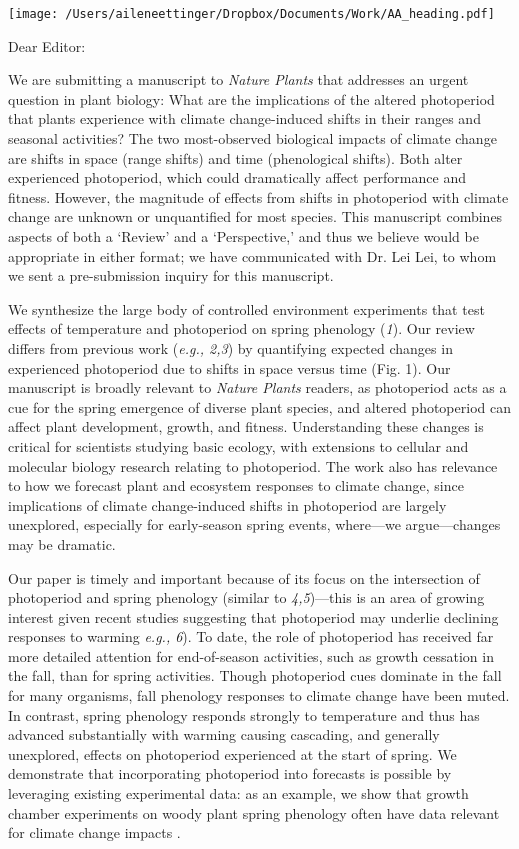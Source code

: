 \documentclass[10.5pt,a4paper]{letter}
\begin{document}
\begin{letter}{}
\texttt{[image: /Users/aileneettinger/Dropbox/Documents/Work/AA\_heading.pdf]}

\opening{Dear Editor:}
We are submitting a manuscript to \emph{Nature Plants} that addresses an urgent question in plant biology: What are the implications
of the altered photoperiod that plants experience with climate change-induced shifts in their ranges and seasonal activities? The two most-observed biological impacts of climate change are shifts in space (range shifts) and time (phenological shifts). Both alter experienced photoperiod, which could dramatically affect performance and fitness. However, the magnitude of effects from shifts in photoperiod with climate change are unknown or unquantified for most species. This manuscript combines aspects of both a `Review' and a `Perspective,' and thus we believe would be appropriate in either format; we have communicated with Dr. Lei Lei, to whom we sent a pre-submission inquiry for this manuscript. 
\par We synthesize the large body of controlled environment experiments that test effects of temperature and photoperiod on spring phenology (\emph{1}). Our review differs from previous work  (\emph{e.g., 2,3}) by quantifying expected changes in experienced photoperiod due to shifts in space versus time (Fig. 1). Our manuscript is  broadly relevant to \emph{Nature Plants} readers, as photoperiod acts as a cue for the spring emergence of diverse plant species, and altered photoperiod can affect plant development, growth, and fitness. Understanding these changes is critical for scientists studying basic ecology, with extensions to cellular and molecular biology research relating to photoperiod. The work also has relevance to how we forecast plant and ecosystem responses to climate change, since implications of climate change-induced shifts in photoperiod are largely unexplored, especially for early-season spring events, where---we argue---changes may be dramatic.

\par Our paper is timely and important because of its focus on the intersection of photoperiod and spring phenology (similar to \emph{4,5})---this is an area of growing interest given recent studies suggesting that photoperiod may underlie declining responses to warming \emph{e.g., 6}). To date, the role of photoperiod has received far more detailed attention for end-of-season activities, such as growth cessation in the fall, than for spring activities. Though photoperiod cues dominate in the fall for many organisms, fall phenology responses to climate change have been muted. In contrast, spring phenology responds strongly to temperature and thus has advanced substantially with warming causing cascading, and generally unexplored, effects on photoperiod experienced at the start of spring. We demonstrate that incorporating photoperiod into forecasts is possible by leveraging existing experimental data: as an example, we show that growth chamber experiments on woody plant spring phenology often have data relevant for climate change impacts . 


\end{letter}
\end{document}
